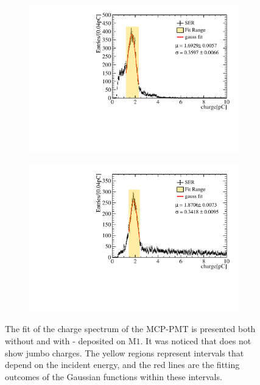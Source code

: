 \begin{figure}[!ht]
	\centering
	\begin{subfigure}[b]{0.48\textwidth}
		\centering
		\includegraphics[width=\textwidth]{PMTRelated/GTmodel/fit_noald.pdf}
		\caption{}
		\label{fig:gain_noald}
	\end{subfigure}
	\hfill
	\begin{subfigure}[b]{0.48\textwidth}
		\centering
		\includegraphics[width=\textwidth]{PMTRelated/GTmodel/fit_ald.pdf}
		\caption{}
		\label{fig:gain_ald}
	\end{subfigure}

	\caption{The fit of the charge spectrum of the MCP-PMT is presented both without  and with  - deposited on $\mathrm{M}1$. It was noticed that  does not show jumbo charges. The yellow regions represent intervals that depend on the incident energy, and the red lines are the fitting outcomes of the Gaussian functions within these intervals.
	}
	\label{fig:gain_fit}
\end{figure}

